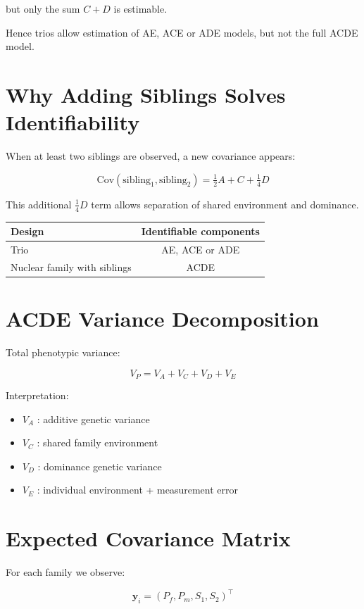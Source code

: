 \documentclass[11pt]{article}
\begin{document}
but only the sum $C + D$ is estimable.

Hence trios allow estimation of AE, ACE or ADE models,
but not the full ACDE model.

\section{Why Adding Siblings Solves Identifiability}

When at least two siblings are observed, a new covariance appears:

\[
\text{Cov}(\text{sibling}_1,\text{sibling}_2)
= \tfrac12 A + C + \tfrac14 D
\]

This additional $\tfrac14 D$ term allows separation of
shared environment and dominance.

\begin{center}
\begin{tabular}{lc}
\toprule
Design & Identifiable components \\ \midrule
Trio & AE, ACE or ADE \\
Nuclear family with siblings & ACDE \\
\bottomrule
\end{tabular}
\end{center}

\section{ACDE Variance Decomposition}

Total phenotypic variance:

\[
V_P = V_A + V_C + V_D + V_E
\]

Interpretation:

\begin{itemize}
\item $V_A$ : additive genetic variance
\item $V_C$ : shared family environment
\item $V_D$ : dominance genetic variance
\item $V_E$ : individual environment + measurement error
\end{itemize}

\section{Expected Covariance Matrix}

For each family we observe:

\[
\mathbf{y}_i = (P_f, P_m, S_1, S_2)^\top
\]
\end{document}
